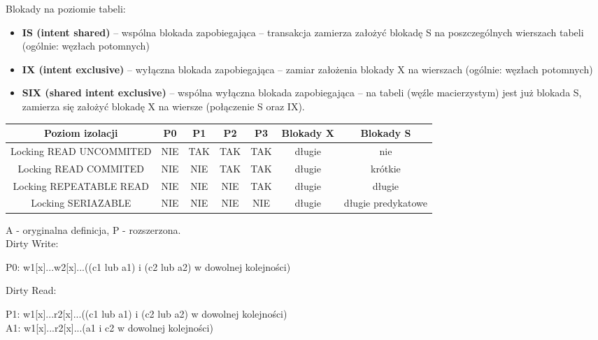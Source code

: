 \documentclass[main.tex]{subfiles}
\begin{document}
    \noindent Blokady na poziomie tabeli:
    \begin{itemize}[noitemsep]
        \item \textbf{IS (intent shared)} – wspólna blokada zapobiegająca – transakcja zamierza założyć blokadę S
        na poszczególnych wierszach tabeli (ogólnie: węzłach potomnych)
        \item \textbf{IX (intent exclusive)} – wyłączna blokada zapobiegająca – zamiar założenia blokady X na
        wierszach (ogólnie: węzłach potomnych)
        \item \textbf{SIX (shared intent exclusive)} – wspólna wyłączna blokada zapobiegająca – na tabeli (węźle
        macierzystym) jest już blokada S, zamierza się założyć blokadę X na wiersze (połączenie S
        oraz IX).
    \end{itemize}

    \begin{table}[H]
        \begin{tabular}{|c|c|c|c|c|c|c| }
            \hline
            Poziom izolacji & P0 & P1 & P2 & P3 & Blokady X & Blokady S \\
            \hline
            Locking READ UNCOMMITED & NIE & TAK & TAK & TAK & długie & nie \\
            \hline
            Locking READ COMMITED & NIE & NIE & TAK & TAK & długie & krótkie\\
            \hline
            Locking REPEATABLE READ & NIE & NIE & NIE & TAK & długie & długie\\
            \hline
            Locking SERIAZABLE & NIE & NIE & NIE & NIE & długie & długie predykatowe\\
            \hline
        \end{tabular}
    \end{table}

    A - oryginalna definicja, P - rozszerzona.\\

    \noindent Dirty Write:
    \begin{center}
        P0: w1[x]...w2[x]...((c1 lub a1) i (c2 lub a2) w dowolnej kolejności)
    \end{center}

    \noindent Dirty Read:
    \begin{center}
        P1: w1[x]...r2[x]...((c1 lub a1) i (c2 lub a2) w dowolnej kolejności)\\
        A1: w1[x]...r2[x]...(a1 i c2 w dowolnej kolejności)\\
    \end{center}
\end{document}

